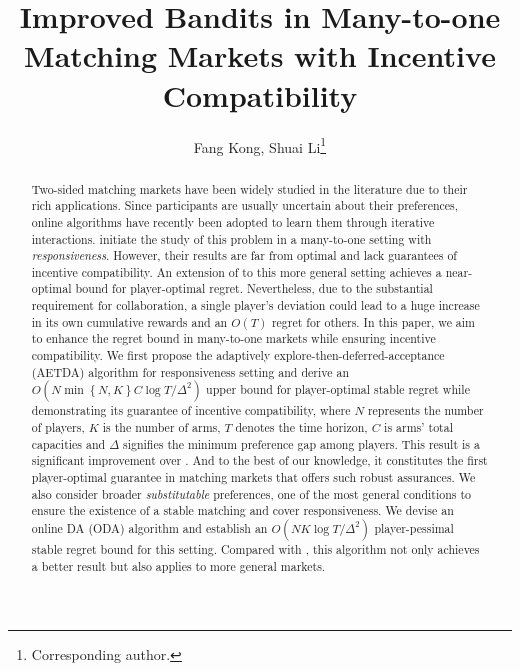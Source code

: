 \documentclass[letterpaper]{article} %
\title{
Improved Bandits in Many-to-one Matching Markets with Incentive Compatibility
}
\author {
    Fang Kong, Shuai Li\thanks{Corresponding author.}
}
\newcommand{\set}[1]{\left\{ #1 \right\}}
\begin{document}
\maketitle

\begin{abstract}
Two-sided matching markets have been widely studied in the literature due to their rich applications. Since participants are usually uncertain about their preferences, online algorithms have recently been adopted to learn them through iterative interactions. \citet{wang2022bandit} initiate the study of this problem in a many-to-one setting with \textit{responsiveness}. However, their results are far from optimal and lack guarantees of incentive compatibility. An extension of \citet{kong2023player} to this more general setting achieves a near-optimal bound for player-optimal regret. Nevertheless, due to the substantial requirement for collaboration, a single player's deviation could lead to a huge increase in its own cumulative rewards and an $O(T)$ regret for others. In this paper, we aim to enhance the regret bound in many-to-one markets while ensuring incentive compatibility. We first propose the adaptively explore-then-deferred-acceptance (AETDA) algorithm for responsiveness setting and derive an $O(N\min\set{N,K}C\log T/\Delta^2)$ upper bound for player-optimal stable regret while demonstrating its guarantee of incentive compatibility, where $N$ represents the number of players, $K$ is the number of arms, $T$ denotes the time horizon, $C$ is arms' total capacities and $\Delta$ signifies the minimum preference gap among players. This result is a significant improvement over \citet{wang2022bandit}. And to the best of our knowledge, it constitutes the first player-optimal guarantee in matching markets that offers such robust assurances. We also consider broader \textit{substitutable} preferences, one of the most general conditions to ensure the existence of a stable matching and cover responsiveness. We devise an online DA (ODA) algorithm and establish an $O(NK\log T/\Delta^2)$ player-pessimal stable regret bound for this setting. Compared with \citet{wang2022bandit}, this algorithm not only achieves a better result but also applies to more general markets. 
\end{abstract}













% 
\end{document}
